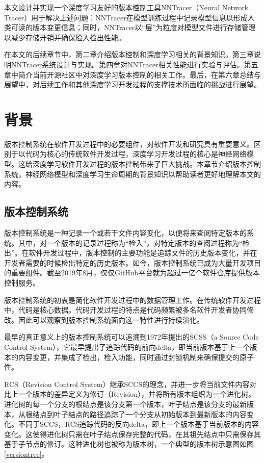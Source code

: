 \documentclass{cjc}
\begin{document}
本文设计并实现一个深度学习友好的版本控制工具NNTracer（Neural Network Tracer）用于解决上述问题：NNTracer在模型训练过程中记录模型信息以形成人类可读的版本变更信息；同时，NNTracer以“层”为粒度对模型文件进行存储管理以减少存储开销并确保检入检出性能。

在本文的后续章节中，第二章介绍版本控制和深度学习相关的背景知识。第三章说明NNTracer系统设计与实现。第四章对NNTracer相关性能进行实验与评估。第五章中简介当前开源社区中对深度学习版本控制的相关工作。最后，在第六章总结与展望中，对后续工作和其他深度学习开发过程的支撑技术所面临的挑战进行展望。


\section{背景}


版本控制系统在软件开发过程中的必要组件，对软件开发和研究具有重要意义。区别于以代码为核心的传统软件开发过程，深度学习开发过程的核心是神经网络模型。这给深度学习软件开发过程的版本控制带来了巨大挑战。本章节介绍版本控制系统，神经网络模型和深度学习生命周期的背景知识以帮助读者更好地理解本文的内容。

\subsection{版本控制系统}

版本控制系统是一种记录一个或若干文件内容变化，以便将来查阅特定版本的系统。其中，对一个版本的记录过程称为“检入”，对特定版本的查阅过程称为“检出”。在软件开发过程中，版本控制的主要功能是追踪文件的历史版本变化，并在开发者需要的时候检出特定的历史版本。如今，版本控制系统已成为大量开发项目的重要组件。截至2019年8月，仅仅GitHub平台就为超过一亿个软件仓库提供版本控制服务。

版本控制系统的初衷是简化软件开发过程中的数据管理工作。在传统软件开发过程中，代码是核心数据。代码开发过程的特点是代码频繁被多名软件开发者协同修改。因此可以观察到版本控制系统面向这一特性进行持续演化。

最早的真正意义上的版本控制系统可以追溯到1972年提出的SCSS（a Source Code Control System），它最早提出了追踪代码的前向delta，即当前版本基于上一个版本的内容变更，并集成了检出，检入功能，同时通过封锁机制来确保提交的原子性。

RCS（Revision Control System）继承SCCS的理念，并进一步将当前文件内容对比上一个版本的差异定义为修订（Revision），并将所有版本组织为一个进化树。进化树的每一个分支的根结点是该分支第一个版本，叶子结点是该分支的最新版本，从根结点到叶子结点的路径追踪了一个分支从初始版本到最新版本的内容变化。不同于SCCS，RCS追踪代码的反向delta，即上一个版本基于当前版本的内容变化。这使得进化树只需在叶子结点保存完整的代码，在其祖先结点中只需保存其基于子节点的修订。这种进化树也被称为版本树，一个典型的版本树示意图如图\ref{versiontree}。
\end{document}
